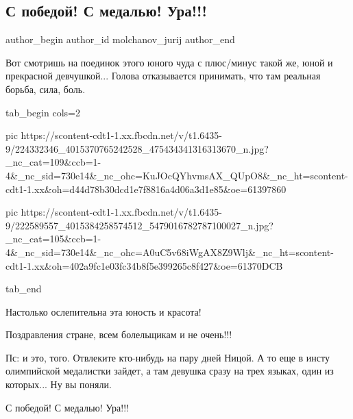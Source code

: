  
 
 
 
 
 
\subsection{С победой! С медалью! Ура!!!}
\label{sec:24_07_2021.fb.molchanov_jurij.1.s_pobedoj}
 
\ifcmt
 author_begin
   author_id molchanov_jurij
 author_end
\fi

Вот смотришь на поединок этого юного чуда с плюс/минус такой же, юной и
прекрасной девчушкой... Голова отказывается принимать, что там реальная борьба,
сила, боль.

\ifcmt
  tab_begin cols=2

     pic https://scontent-cdt1-1.xx.fbcdn.net/v/t1.6435-9/224332346_4015370765242528_475434341316313670_n.jpg?_nc_cat=109&ccb=1-4&_nc_sid=730e14&_nc_ohc=KuJOcQYhvmsAX_QUpO8&_nc_ht=scontent-cdt1-1.xx&oh=d44d78b30dcd1e7f8816a4d06a3d1e85&oe=61397860

     pic https://scontent-cdt1-1.xx.fbcdn.net/v/t1.6435-9/222589557_4015384258574512_5479016782787100027_n.jpg?_nc_cat=105&ccb=1-4&_nc_sid=730e14&_nc_ohc=A0uC5v68iWgAX8Z9Wlj&_nc_ht=scontent-cdt1-1.xx&oh=402a9fc1e03fc34b8f5e399265c8f427&oe=61370DCB

  tab_end
\fi

Настолько ослепительна эта юность и красота!

Поздравления стране, всем болельщикам и не очень!!!

Пс: и это, того. Отвлеките кто-нибудь на пару дней Ницой. А то еще в инсту
олимпийской медалистки зайдет, а там девушка сразу на трех языках, один из
которых... Ну вы поняли.

С победой! С медалью! Ура!!!

